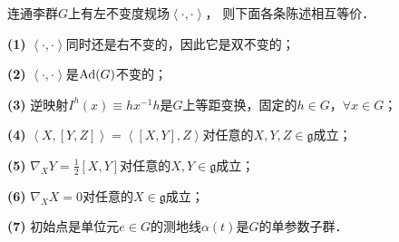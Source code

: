 \begin{theorem}\label{chlg:thm_biinmg}
    连通李群$G$上有左不变度规场$\left<\cdot,\cdot\right>$，
    则下面各条陈述相互等价．
    
    {\bfseries (1)} $\left<\cdot,\cdot\right>$同时还是右不变的，因此它是双不变的；
    
    {\bfseries (2)} $\left<\cdot,\cdot\right>$是${\rm Ad}(G)$不变的；
    
    {\bfseries (3)} 逆映射$I^h(x)\equiv h  x^{-1} h $是$G$上等距变换，固定的$h\in G$，$\forall x\in G$；
    
    {\bfseries (4)} $\left<X,[Y,Z]\right>=\left<[X,Y],Z\right>$对任意的$X,Y,Z\in \mathfrak{g}$成立；
    
    {\bfseries (5)} $\nabla_X Y = \frac{1}{2} [X,Y]$对任意的$X,Y\in \mathfrak{g}$成立；
    
    {\bfseries (6)} $\nabla_X X = 0$对任意的$X\in \mathfrak{g}$成立；
    
    {\bfseries (7)} 初始点是单位元$e\in G$的测地线$\alpha(t)$是$G$的单参数子群．
\end{theorem}
